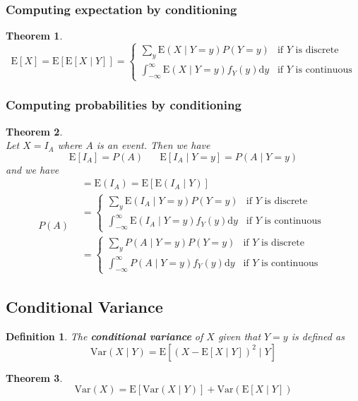 \documentclass[12pt]{article}
\newcommand{\diff}{\mathrm{d}}
\newcommand{\var}{\mathrm{Var}}
\newcommand{\expec}{\mathrm{E}}
\newtheorem{definition}{Definition}[section]
\newtheorem{theorem}{Theorem}[section]
\theoremstyle{definition}
\begin{document}
\subsubsection{Computing expectation by conditioning}
\begin{theorem}\hfill\\\normalfont
\[
\expec[X]=\expec[\expec[X\mid Y]]=\begin{cases}
\sum_y \expec(X\mid Y=y)P(Y=y)&\text{if }Y \text{ is discrete}\\
\int_{-\infty}^\infty \expec(X\mid Y=y)f_Y(y)\diff y &\text{if }Y\text{ is continuous}
\end{cases}
\]
\end{theorem}
\subsubsection{Computing probabilities by conditioning}
\begin{theorem}\hfill\\\normalfont
Let $X=I_A$ where $A$ is an event. Then we have
\[
\expec[I_A]=P(A)\;\;\;\;\;\; \expec[I_A\mid Y=y]=P(A\mid Y=y)
\]
and we have
\[
P(A)
\begin{aligned}
&=\expec(I_A)=\expec[\expec(I_A\mid Y)]\\
&=\begin{cases}
\sum_y \expec(I_A\mid Y=y)P(Y=y)&\text{if }Y\text{ is discrete}\\
\int_{-\infty}^\infty \expec(I_A\mid Y=y)f_Y(y)\diff y&\text{if }Y\text{ is continuous}
\end{cases}\\
&=\begin{cases}
\sum_y P(A\mid Y=y)P(Y=y)&\text{if }Y\text{ is discrete}\\
\int_{-\infty}^\infty P(A\mid Y=y)f_Y(y)\diff y&\text{if }Y\text{ is continuous}
\end{cases}
\end{aligned}
\]
\end{theorem}
\subsection{Conditional Variance}
\begin{definition}\normalfont The \textbf{conditional variance} of $X$ given that $Y=y$ is defined as
\[
\var(X\mid Y)=\expec[(X-\expec[X\mid Y])^2\mid Y]
\]
\end{definition}
\begin{theorem}\normalfont
\[
\var(X)=\expec[\var(X\mid Y)]+\var(\expec[X\mid Y])
\]
\end{theorem}
\end{document}
